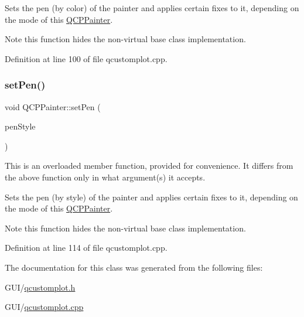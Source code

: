 Sets the pen (by color) of the painter and applies certain fixes to it, depending on the mode of this \hyperlink{class_q_c_p_painter}{Q\+C\+P\+Painter}.

\begin{DoxyNote}{Note}
this function hides the non-\/virtual base class implementation. 
\end{DoxyNote}


Definition at line 100 of file qcustomplot.\+cpp.

\mbox{\label{class_q_c_p_painter_a25e76095aae41da0d08035060e5f81ca}} 
\subsubsection{\texorpdfstring{set\+Pen()}{setPen()}\hspace{0.1cm}{\footnotesize\ttfamily [3/3]}}
{\footnotesize\ttfamily void Q\+C\+P\+Painter\+::set\+Pen (\begin{DoxyParamCaption}\item[{Qt\+::\+Pen\+Style}]{pen\+Style }\end{DoxyParamCaption})}

This is an overloaded member function, provided for convenience. It differs from the above function only in what argument(s) it accepts.

Sets the pen (by style) of the painter and applies certain fixes to it, depending on the mode of this \hyperlink{class_q_c_p_painter}{Q\+C\+P\+Painter}.

\begin{DoxyNote}{Note}
this function hides the non-\/virtual base class implementation. 
\end{DoxyNote}


Definition at line 114 of file qcustomplot.\+cpp.



The documentation for this class was generated from the following files\+:\begin{DoxyCompactItemize}
\item 
G\+U\+I/\hyperlink{qcustomplot_8h}{qcustomplot.\+h}\item 
G\+U\+I/\hyperlink{qcustomplot_8cpp}{qcustomplot.\+cpp}\end{DoxyCompactItemize}
